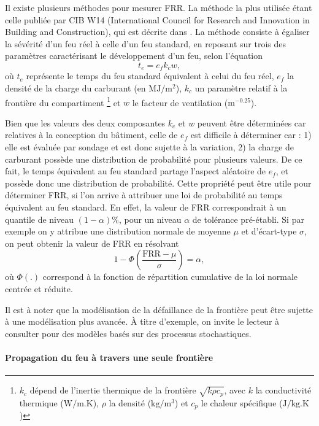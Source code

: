 \documentclass[11pt]{article}
\begin{document}
Il existe plusieurs méthodes pour mesurer FRR. La méthode la plus utilisée étant celle publiée par CIB W14 (International Council for Research and Innovation in
Building and Construction), qui est décrite dans \cite{buchanan2017structural}. La méthode consiste à égaliser la sévérité d'un feu réel à celle d'un feu standard, en reposant sur trois des paramètres caractérisant le développement d'un feu, selon l'équation
\begin{equation}
t_e = e_f k_c w,
\end{equation}  
où $t_e$ représente le temps du feu standard équivalent à celui du feu réel, $e_f$ la densité de la charge du carburant (en $\text{MJ}/\text{m}^2$), $k_c$ un paramètre relatif à la frontière du compartiment \footnote{$k_c$ dépend de l'inertie thermique de la frontière $\sqrt{k\rho c_p}$, avec $k$ la conductivité thermique ($\text{W}/\text{m.K}$), $\rho$ la densité ($\text{kg}/\text{m}^3$) et $c_p$ le chaleur spécifique ($\text{J}/\text{kg.K}$)} et $w$ le facteur de ventilation ($\text{m}^{-0.25}$). 

Bien que les valeurs des deux composantes $k_c$ et $w$ peuvent être déterminées car relatives à la conception du bâtiment, celle de $e_f$ est difficile à déterminer car : 1) elle est évaluée par sondage et est donc sujette à la variation, 2) la charge de carburant possède une distribution de probabilité pour plusieurs valeurs. De ce fait, le temps équivalent au feu standard partage l'aspect aléatoire de $e_f$, et possède donc une distribution de probabilité. Cette propriété peut être utile pour déterminer FRR, si l'on arrive à attribuer une loi de probabilité au temps équivalent au feu standard. En effet, la valeur de FRR correspondrait à un quantile de niveau $(1-\alpha)\%$, pour un niveau $\alpha$ de tolérance pré-établi. Si par exemple on y attribue une distribution normale de moyenne $\mu$ et d'écart-type $\sigma$, on peut obtenir la valeur de FRR en résolvant
\begin{equation}
1- \Phi \left( \frac{\text{FRR} - \mu}{\sigma} \right)= \alpha,
\end{equation}
où $\Phi(.)$ correspond à la fonction de répartition cumulative de la loi normale centrée et réduite.

Il est à noter que la modélisation de la défaillance de la frontière peut être sujette à une modélisation plus avancée. À titre d'exemple, on invite le lecteur à consulter \cite{rychlik2006probability} pour des modèles basés sur des processus stochastiques.

\paragraph{Propagation du feu à travers une seule frontière}
\end{document}
